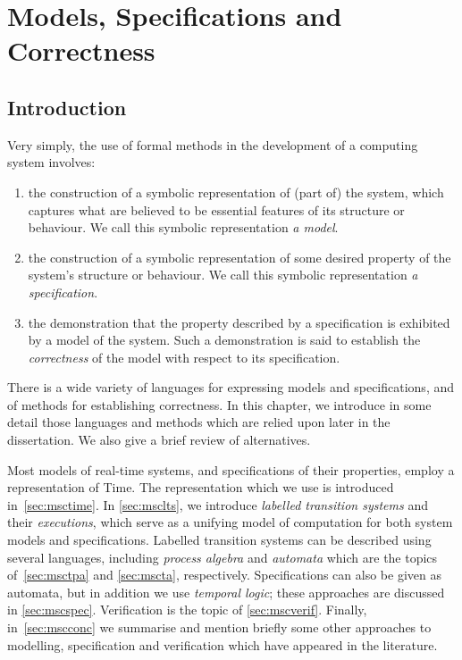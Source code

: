 \chapter{Models, Specifications and Correctness}\label{chap:methods}
\section{Introduction}\label{sec:mscintro}
Very simply, the use of formal methods in the development of a
computing system involves: 
\begin{enumerate}
\item the construction of a symbolic representation of (part of) the system,
  which captures what are believed to be essential features of its
  structure or behaviour. We call this symbolic representation \emph{a model}.
\item the construction of a symbolic representation of some desired property 
  of the system's structure or behaviour. We call this symbolic
  representation \emph{a specification}.
\item the demonstration that the property described by a specification
  is exhibited by a model of the system. Such a demonstration is said
  to establish the \emph{correctness} of the model with respect to its 
  specification. 
\end{enumerate}
There is a wide variety of languages for expressing models and specifications,
and of methods for establishing correctness. In this chapter, we 
introduce in some detail those languages and methods which are relied upon
later in the dissertation. We also give a brief review of alternatives.

Most models of real-time systems, and specifications of their
properties, employ a representation of Time. The representation which
we use is introduced in~\Sec\ref{sec:msctime}.  In \Sec\ref{sec:msclts},
we introduce \emph{labelled transition systems} and their
\emph{executions}, which serve as a unifying model of computation for
both system models and specifications. Labelled transition systems can
be described using several languages, including \emph{process algebra}
and \emph{automata} which are the topics of~\Sec\ref{sec:msctpa} and
\Sec\ref{sec:mscta}, respectively. Specifications can also be given
as automata, but in addition we use \emph{temporal logic}; these approaches
are discussed in \Sec\ref{sec:mscspec}. Verification is the topic of 
\Sec\ref{sec:mscverif}. Finally, in~\Sec\ref{sec:mscconc} we summarise
and mention briefly some other approaches to modelling, specification
and verification which have appeared in the literature.

